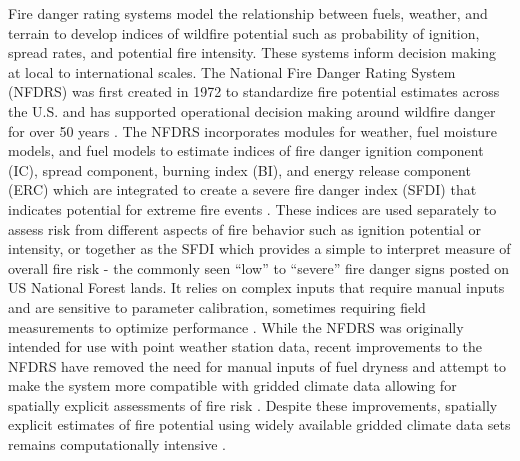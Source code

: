 \documentclass[11p]{article}
\begin{document}
Fire danger rating systems model the relationship between fuels, weather, and terrain to develop indices of wildfire potential such as probability of ignition, spread rates, and potential fire intensity. These systems inform decision making at local to international scales. The National Fire Danger Rating System (NFDRS) was first created in 1972 to standardize fire potential estimates across the U.S. and has supported operational decision making around wildfire danger for over 50 years \citep{jollyModernizingUSNational2024,zacharakisEnvironmentalForestFire2023}. The NFDRS incorporates modules for weather, fuel moisture models, and fuel models to estimate indices of fire danger ignition component (IC), spread component, burning index (BI), and energy release component (ERC) which are integrated to create a severe fire danger index (SFDI) that indicates potential for extreme fire events \citep{jollyModernizingUSNational2024,jollySevereFireDanger2019}. These indices are used separately to assess risk from different aspects of fire behavior such as ignition potential or intensity, or together as the SFDI which provides a simple to interpret measure of overall fire risk - the commonly seen ``low'' to ``severe'' fire danger signs posted on US National Forest lands. It relies on complex inputs that require manual inputs and are sensitive to parameter calibration, sometimes requiring field measurements to optimize performance \citep{jollyModernizingUSNational2024}. While the NFDRS was originally intended for use with point weather station data, recent improvements to the NFDRS have removed the need for manual inputs of fuel dryness and attempt to make the system more compatible with gridded climate data allowing for spatially explicit assessments of fire risk \citep{jollyModernizingUSNational2024}. Despite these improvements, spatially explicit estimates of fire potential using widely available gridded climate data sets remains computationally intensive \citep{farguellFastSpatialNFDRS2025a}.
\end{document}
